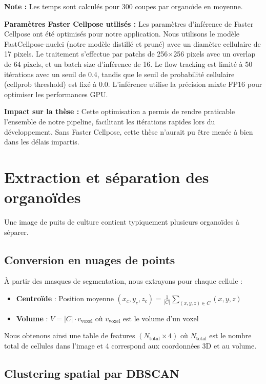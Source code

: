 \textbf{Note :} Les temps sont calculés pour 300 coupes par organoïde en moyenne.

\textbf{Paramètres Faster Cellpose utilisés :}
Les paramètres d'inférence de Faster Cellpose ont été optimisés pour notre application. Nous utilisons le modèle FastCellpose-nuclei (notre modèle distillé et pruné) avec un diamètre cellulaire de 17 pixels. Le traitement s'effectue par patchs de 256×256 pixels avec un overlap de 64 pixels, et un batch size d'inférence de 16. Le flow tracking est limité à 50 itérations avec un seuil de 0.4, tandis que le seuil de probabilité cellulaire (cellprob threshold) est fixé à 0.0. L'inférence utilise la précision mixte FP16 pour optimiser les performances GPU.

\textbf{Impact sur la thèse :}
Cette optimisation a permis de rendre praticable l'ensemble de notre pipeline, facilitant les itérations rapides lors du développement. Sans Faster Cellpose, cette thèse n'aurait pu être menée à bien dans les délais impartis.

\section{Extraction et séparation des organoïdes}

Une image de puits de culture contient typiquement plusieurs organoïdes à séparer.

\subsection{Conversion en nuages de points}

À partir des masques de segmentation, nous extrayons pour chaque cellule :
\begin{itemize}
    \item \textbf{Centroïde} : Position moyenne $(x_c, y_c, z_c) = \frac{1}{|C|}\sum_{(x,y,z) \in C} (x,y,z)$
    \item \textbf{Volume} : $V = |C| \cdot v_{\text{voxel}}$ où $v_{\text{voxel}}$ est le volume d'un voxel
\end{itemize}

Nous obtenons ainsi une table de features $(N_{\text{total}} \times 4)$ où $N_{\text{total}}$ est le nombre total de cellules dans l'image et 4 correspond aux coordonnées 3D et au volume.

\subsection{Clustering spatial par DBSCAN}

